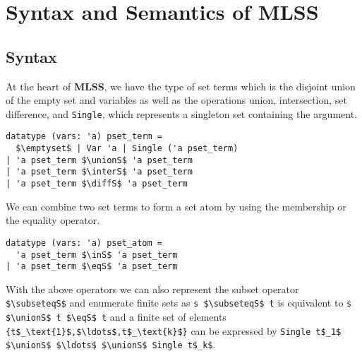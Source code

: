 \documentclass[sigplan,10pt,anonymous,review]{acmart}
\newcommand{\MLSS}{\textbf{MLSS}}
\newcommand{\unionS}{\sqcup_\text{s}}
\newcommand{\interS}{\sqcap_\text{s}}
\newcommand{\diffS}{-_\text{s}}
\newcommand{\inS}{\in_\text{s}}
\newcommand{\eqS}{=_\text{s}}
\newcommand{\subseteqS}{\sqsubseteq_\text{s}}
\begin{document}
\section{Syntax and Semantics of MLSS\label{sec:semantics}}
\subsection{Syntax}
At the heart of \MLSS{}, we have the type of set terms which is the disjoint union of the empty set and variables as well as the operations union, intersection, set difference, and \lstinline!Single!, which represents a singleton set containing the argument.
\begin{lstlisting}
datatype (vars: 'a) pset_term =
  $\emptyset$ | Var 'a | Single ('a pset_term)
| 'a pset_term $\unionS$ 'a pset_term
| 'a pset_term $\interS$ 'a pset_term
| 'a pset_term $\diffS$ 'a pset_term
\end{lstlisting}
We can combine two set terms to form a set atom by using the membership or the equality operator.
\begin{lstlisting}
datatype (vars: 'a) pset_atom =
  'a pset_term $\inS$ 'a pset_term
| 'a pset_term $\eqS$ 'a pset_term
\end{lstlisting}
With the above operators we can also represent the subset operator \lstinline!$\subseteqS$! and enumerate finite sets as \lstinline!s $\subseteqS$ t! is equivalent to \lstinline!s $\unionS$ t $\eqS$ t! and a finite set of elements \lstinline!{t$_\text{1}$,$\ldots$,t$_\text{k}$}! can be expressed by \lstinline!Single t$_1$ $\unionS$ $\ldots$ $\unionS$ Single t$_k$!.
\end{document}
